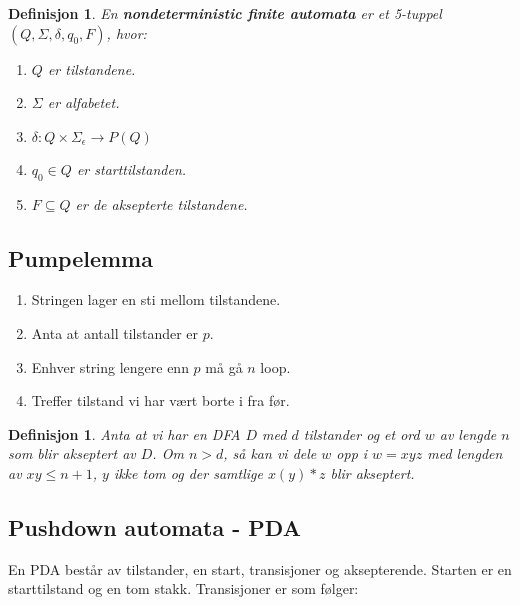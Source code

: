 \documentclass[11pt,a4paper]{article}
\begin{document}
\theoremstyle{mytheoremstyle}
\newtheorem{nfa}{Definisjon}[section]
\begin{nfa}
En \textbf{nondeterministic finite automata} er et 5-tuppel $(Q, \Sigma, \delta, q_0, F)$, hvor:
\begin{enumerate}
\item{$Q$ er tilstandene.}
\item{$\Sigma$ er alfabetet.}
\item{$\delta : Q \times \Sigma_{\epsilon} \longrightarrow P(Q)$}
\item{$q_0 \in Q$ er starttilstanden.}
\item{$F \subseteq Q$ er de aksepterte tilstandene.}
\end{enumerate}
\end{nfa}

\subsection{Pumpelemma}
\begin{enumerate}
\item{Stringen lager en sti mellom tilstandene.}
\item{Anta at antall tilstander er $p$.}
\item{Enhver string lengere enn $p$ må gå $n$ loop.}
\item{Treffer tilstand vi har vært borte i fra før.}
\end{enumerate}

\theoremstyle{mytheoremstyle}
\newtheorem{pumpe}{Definisjon}[section]
\begin{pumpe}
Anta at vi har en DFA $D$ med $d$ tilstander og et ord $w$ av lengde $n$ som blir akseptert av $D$. Om $n > d$, så kan vi dele $w$ opp i $w = xyz$ med lengden av $xy \leq n + 1$, $y$ ikke tom og der samtlige $x(y)*z$ blir akseptert.
\end{pumpe}

\subsection{Pushdown automata - PDA}
En PDA består av tilstander, en start, transisjoner og aksepterende.
Starten er en starttilstand og en tom stakk. Transisjoner er som følger:


\begin{center}
\end{center}
\end{document}
